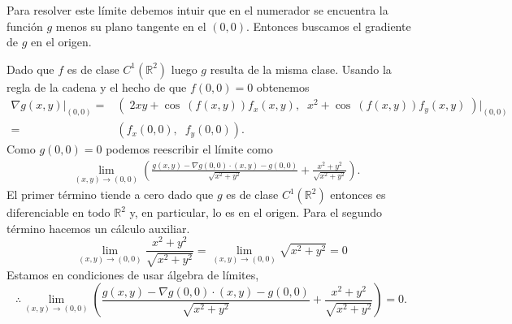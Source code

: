 
\begin{solution}
    Para resolver este límite debemos intuir que en el numerador se encuentra la función $g$ menos su plano tangente en el $(0,0)$. Entonces buscamos el gradiente de $g$ en el origen.

    Dado que $f$ es  de  clase \(C^1(\mathbb{R}^2)\) luego $g$  resulta de la misma clase.  Usando la regla de la cadena  y el hecho de que $f(0,0)=0$ obtenemos
    \begin{align*}
        \nabla g(x,y)\Big\rvert_{(0,0)}= & \left( \;2xy+\cos\:(f(x,y))f_x(x,y),\;\; x^2+\cos\:(f(x,y))f_y(x,y)\; \right) \Big\rvert_{(0,0)} \\
        =                                & \left( f_x(0,0),\;\; f_y(0,0) \right).
    \end{align*}
    Como $g(0,0)=0$ podemos reescribir el límite como
    \begin{align*}
         & \lim_{(x,y)\to(0,0)} \left(\frac{g(x,y)-\nabla g(0,0)\cdot(x,y)-g(0,0)}{\sqrt{x^2+y^2}}+\frac{x^2+y^2}{\sqrt{x^2+y^2}}\right).
    \end{align*}
    El primer término tiende a cero dado que $g$ es  de  clase \(C^1(\mathbb{R}^2)\)  entonces es diferenciable en todo $\mathbb{R}^{2}$ y,  en particular, lo es en el origen.  Para el segundo término hacemos un cálculo auxiliar.
    \[
        \lim_{(x,y)\to(0,0)}\frac{x^2+y^2}{\sqrt{x^2+y^2}}=\lim_{(x,y)\to(0,0)}\sqrt{x^2+y^2}=0
    \]
    Estamos en condiciones de usar \'algebra de l\'imites,
    \[
        \therefore \lim_{(x,y)\to(0,0)} \left(\frac{g(x,y)-\nabla g(0,0)\cdot(x,y)-g(0,0)}{\sqrt{x^2+y^2}}+\frac{x^2+y^2}{\sqrt{x^2+y^2}}\right)=0.
    \]
\end{solution}


